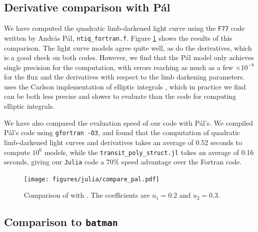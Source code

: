 \documentclass[modern]{aastex61}
\begin{document}
\subsection{Derivative comparison with P\'al}

We have computed the quadratic limb-darkened light curve using the \texttt{F77}
code written by Andr\'as P\'al, \texttt{ntiq\_fortran.f}.
Figure \ref{fig:Pal_comparison} shows the results of this comparison.
The light curve models agree quite well, as do the derivatives, which is
a good check on both codes.  However, we find that the P\'al model only
achieves single precision for the computation, with errors reaching as
much as a few $\times 10^{-8}$ for the flux and the derivatives with
respect to the limb darkening parameters.  \citet{Pal2008} uses the
Carlson implementation of elliptic integrals \citep{Carlson1979},
which in practice we find can be both less precise and slower to
evaluate than the \citet{Bulirsch1965a} code for computing elliptic
integrals.

We have also compared the evaluation speed of our code with P\'al's.
We compiled P\'al's code using \texttt{gfortran -O3}, and found that
the computation of quadratic limb-darkened light curves and
derivatives takes an average of 0.52 seconds to compute $10^6$ models,
while the \texttt{transit\_poly\_struct.jl} takes an average of 0.16 seconds,
giving our \texttt{Julia} code a 70\% speed advantage over the Fortran code.

\begin{figure}[p!]
    \begin{centering}
    \texttt{[image: figures/julia/compare\_pal.pdf]}
    \caption{Comparison of \citet{Pal2008} with \thiswork.  The
    coefficients are $u_1=0.2$ and $u_2=0.3$. 
    \label{fig:Pal_comparison}}
    \end{centering}
\end{figure}

\subsection{Comparison to \texttt{batman}}
\end{document}
